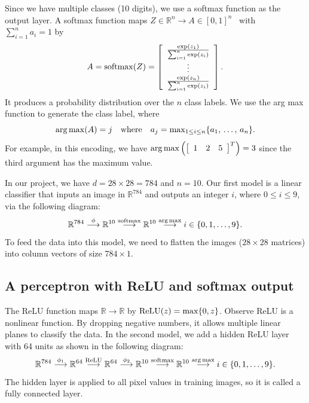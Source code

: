 \documentclass{article}
\begin{document}
Since we have multiple classes (10 digits), we use a softmax function as the output layer. A softmax function maps $Z\in\mathbb{R}^{n} \to A\in [0, 1]^{n}$ \, with \, $\sum_{i=1}^{n} a_i=1$ by
$$
A={\rm softmax}(Z)=\left[\begin{array}{c} \frac{{\rm exp}(z_1)}{\sum_{i=1}^n {\rm exp}(z_i)}\\ \vdots\\ \frac{{\rm exp}(z_n)}{\sum_{i=1}^n {\rm exp}(z_i)}\end{array}\right].
$$
It produces a probability distribution over the $n$ class labels. We use the arg max function to generate the class label, where
$$
{\rm arg\,max}(A)=j \quad {\rm where} \quad a_{j}={\rm max}_{1\leq i\leq n}\{a_{1}, \,\dots , \,a_{n}\}.
$$
For example, in this encoding, we have ${\rm arg\,max} \left(\left[\begin{array}{ccc}1&2&5\end{array}\right]^T\right)
=3$ since the third argument has the maximum value.

In our project, we have $d=28\times 28=784$ and $n=10$. Our first model is a linear classifier that inputs an image in $\mathbb{R}^{784}$ and outputs an integer $i$, where $0\leq i\leq 9$, via the following diagram:
$$
\mathbb{R}^{784} \stackrel{\,\,\phi\,\,}{\longrightarrow} \mathbb{R}^{10}
\stackrel{\rm softmax}{\longrightarrow}\mathbb{R}^{10}\stackrel{\rm arg\,max}{\longrightarrow} i\in \{0, 1, \ldots, 9\}.
$$
To feed the data into this model, we need to flatten the images ($28\times 28$ matrices) into column vectors of size $784\times 1$.

\subsection{A perceptron with ReLU and softmax output} The ReLU function maps $\mathbb{R} \to \mathbb{R}$ by
${\rm ReLU}(z)={\rm max}\{0, z\}$. 
Observe ReLU is a nonlinear function. By dropping negative numbers, it allows multiple linear planes to classify the data.
In the second model, we add a hidden ReLU layer with 64 units as shown in the following diagram:
$$
\mathbb{R}^{784} \stackrel{\,\,\phi_1\,\,}{\longrightarrow} \mathbb{R}^{64} \stackrel{\rm ReLU}{\longrightarrow} \mathbb{R}^{64} \stackrel{\,\,\phi_2\,\,}{\longrightarrow} \mathbb{R}^{10} \stackrel{\rm softmax}{\longrightarrow}\mathbb{R}^{10}
\stackrel{\rm arg\,max}{\longrightarrow} i\in \{0, 1, \ldots, 9\}.
$$
The hidden layer is applied to all pixel values in training images, so it is called a fully connected layer.
\end{document}
